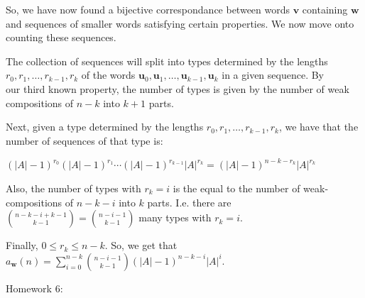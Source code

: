 \documentclass{book}
\newenvironment{myIndent}{%
   \begin{adjustwidth}{2.5em}{0em}%
}{%
   \end{adjustwidth}%
}
\newcommand{\retTwo}{\hfill\bigbreak}
\newcommand{\mHeader}[1]{{
   \color{Black}%
   \fontsize{20}{18}\selectfont%
   #1\retTwo
}}
\begin{document}
\begin{myIndent}
   So, we have now found a bijective correspondance between words $\bm{v}$ containing $\bm{w}$ and sequences of smaller words satisfying certain properties. We now move onto counting these sequences.\retTwo

   The collection of sequences will split into types determined by the lengths\\ $r_0, r_1, \ldots, r_{k-1}, r_k$ of the words $\bm{u}_0, \bm{u}_1, \ldots, \bm{u}_{k-1}, \bm{u}_k$ in a given sequence. By\\ our third known property, the number of types is given by the number of weak\\ compositions of $n - k$ into $k + 1$ parts.\retTwo

   Next, given a type determined by the lengths $r_0, r_1, \ldots, r_{k-1}, r_k$, we have that the number of sequences of that type is:
   
   {\centering $(|A| - 1)^{r_0}(|A| - 1)^{r_1}\cdots(|A| - 1)^{r_{k-1}}|A|^{r_k} = (|A| - 1)^{n-k-r_k}|A|^{r_k}$\retTwo\par}

   Also, the number of types with $r_k = i$ is the equal to the number of weak-compositions of $n - k - i$ into $k$ parts. I.e. there are $\binom{n - k - i + k - 1}{k - 1} = \binom{n - i -1}{k - 1}$ many types with $r_k = i$.\retTwo

   Finally, $0 \leq r_k \leq n - k$. So, we get that $a_{\bm{w}}(n) = \sum\limits_{i = 0}^{n - k}\binom{n - i -1}{k - 1}(|A| - 1)^{n - k - i}|A|^i$.\newpage   
\end{myIndent}

\mHeader{Homework 6:}
\end{document}
